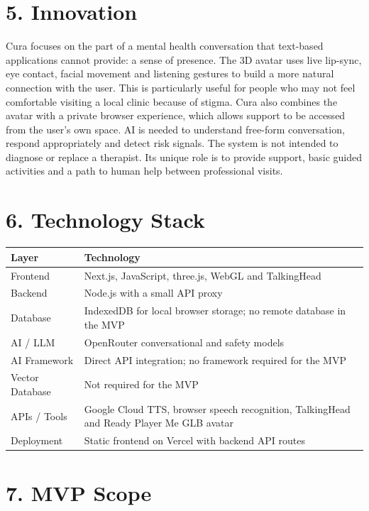 \documentclass[9pt,a4paper]{article}
\begin{document}
\section*{5. Innovation}

Cura focuses on the part of a mental health conversation that text-based
applications cannot provide: a sense of presence. The 3D avatar uses live
lip-sync, eye contact, facial movement and listening gestures to build a more
natural connection with the user. This is particularly useful for people who
may not feel comfortable visiting a local clinic because of stigma. Cura also
combines the avatar with a private browser experience, which allows support to
be accessed from the user's own space. AI is needed to understand free-form
conversation, respond appropriately and detect risk signals. The system is not
intended to diagnose or replace a therapist. Its unique role is to provide
support, basic guided activities and a path to human help between professional
visits.

\section*{6. Technology Stack}

\begin{tabularx}{\textwidth}{@{}p{3.2cm}Y@{}}
\textbf{Layer} & \textbf{Technology} \\
\hline
Frontend & Next.js, JavaScript, three.js, WebGL and TalkingHead \\
Backend & Node.js with a small API proxy \\
Database & IndexedDB for local browser storage; no remote database in the MVP \\
AI / LLM & OpenRouter conversational and safety models \\
AI Framework & Direct API integration; no framework required for the MVP \\
Vector Database & Not required for the MVP \\
APIs / Tools & Google Cloud TTS, browser speech recognition, TalkingHead and
Ready Player Me GLB avatar \\
Deployment & Static frontend on Vercel with backend API routes \\
\end{tabularx}

\section*{7. MVP Scope}
\end{document}
